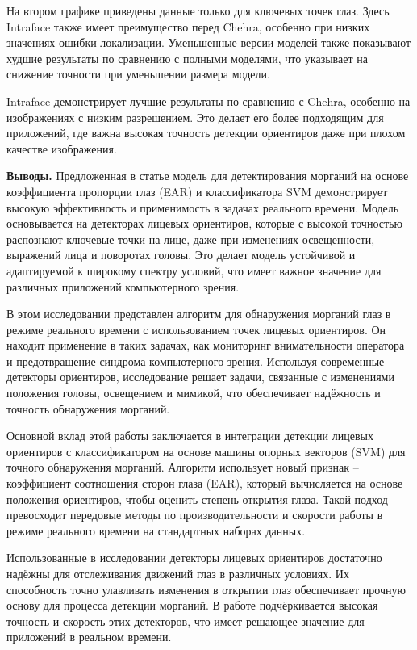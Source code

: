 На втором графике приведены данные только для ключевых точек глаз. Здесь
Intraface также имеет преимущество перед Chehra, особенно при низких
значениях ошибки локализации. Уменьшенные версии моделей также
показывают худшие результаты по сравнению с полными моделями, что
указывает на снижение точности при уменьшении размера модели.

Intraface демонстрирует лучшие результаты по сравнению с Chehra,
особенно на изображениях с низким разрешением. Это делает его более
подходящим для приложений, где важна высокая точность детекции
ориентиров даже при плохом качестве изображения.

{\bfseries Выводы.} Предложенная в статье модель для детектирования
морганий на основе коэффициента пропорции глаз (EAR) и классификатора
SVM демонстрирует высокую эффективность и применимость в задачах
реального времени. Модель основывается на детекторах лицевых ориентиров,
которые с высокой точностью распознают ключевые точки на лице, даже при
изменениях освещенности, выражений лица и поворотах головы. Это делает
модель устойчивой и адаптируемой к широкому спектру условий, что имеет
важное значение для различных приложений компьютерного зрения.

В этом исследовании представлен алгоритм для обнаружения морганий глаз в
режиме реального времени с использованием точек лицевых ориентиров. Он
находит применение в таких задачах, как мониторинг внимательности
оператора и предотвращение синдрома компьютерного зрения. Используя
современные детекторы ориентиров, исследование решает задачи, связанные
с изменениями положения головы, освещением и мимикой, что обеспечивает
надёжность и точность обнаружения морганий.

Основной вклад этой работы заключается в интеграции детекции лицевых
ориентиров с классификатором на основе машины опорных векторов (SVM) для
точного обнаружения морганий. Алгоритм использует новый признак --
коэффициент соотношения сторон глаза (EAR), который вычисляется на
основе положения ориентиров, чтобы оценить степень открытия глаза. Такой
подход превосходит передовые методы по производительности и скорости
работы в режиме реального времени на стандартных наборах данных.

Использованные в исследовании детекторы лицевых ориентиров достаточно
надёжны для отслеживания движений глаз в различных условиях. Их
способность точно улавливать изменения в открытии глаз обеспечивает
прочную основу для процесса детекции морганий. В работе подчёркивается
высокая точность и скорость этих детекторов, что имеет решающее значение
для приложений в реальном времени.

